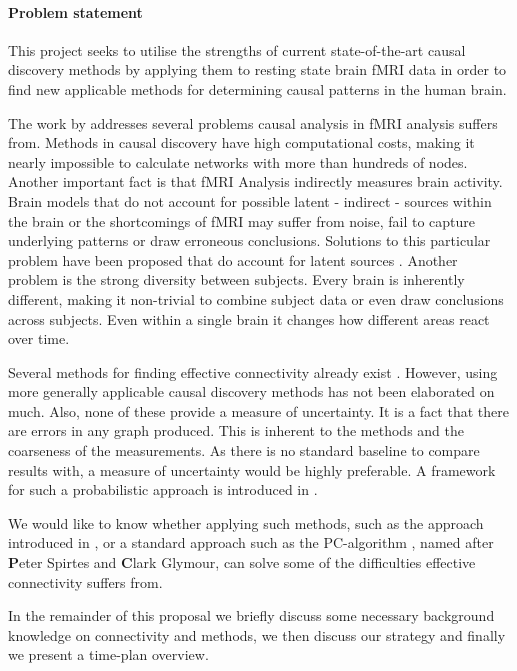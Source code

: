 \documentclass[a4paper, 10pt, english, onecolumn]{article}
\begin{document}
\paragraph{Problem statement}
This project seeks to utilise the strengths of current state-of-the-art causal discovery methods by applying them to resting state brain fMRI data in order to find new applicable methods for determining causal patterns in the human brain.

The work by \cite{ramsey2010} addresses several problems causal analysis in fMRI analysis suffers from.
Methods in causal discovery have high computational costs, making it nearly impossible to calculate networks with more than hundreds of nodes.
Another important fact is that fMRI Analysis indirectly measures brain activity.
Brain models that do not account for possible latent - indirect - sources within the brain or the shortcomings of fMRI may suffer from noise, fail to capture underlying patterns or draw erroneous conclusions.
Solutions to this particular problem have been proposed that do account for latent sources \cite{ramsey2010, waldorp2011}.
Another problem is the strong diversity between subjects.
Every brain is inherently different, making it non-trivial to combine subject data or even draw conclusions across subjects.
Even within a single brain it changes how different areas react over time.

Several methods for finding effective connectivity already exist \cite{mclntosh1994, harrison2003, friston2003, roebroeck2005}.
However, using more generally applicable causal discovery methods has not been elaborated on much.
Also, none of these provide a measure of uncertainty.
It is a fact that there are errors in any graph produced.
This is inherent to the methods and the coarseness of the measurements.
As there is no standard baseline to compare results with, a measure of uncertainty would be highly preferable.
A framework for such a probabilistic approach is introduced in \cite{claassen2012}.

We would like to know whether applying such methods, such as the approach introduced in \cite{claassen2012}, or a standard approach such as the PC-algorithm \cite{spirtes2000}, named after \textbf{P}eter Spirtes and \textbf{C}lark Glymour, can solve some of the difficulties effective connectivity suffers from.

In the remainder of this proposal we briefly discuss some necessary background knowledge on connectivity and methods, we then discuss our strategy and finally we present a time-plan overview.
\end{document}
